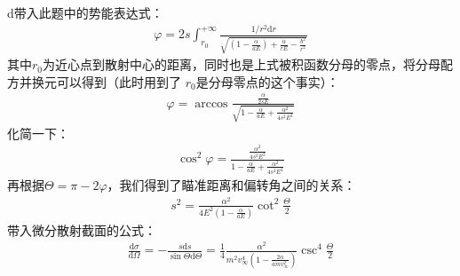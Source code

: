 \documentclass[a4paper]{ctexart}
\def\d{\mathrm{d}}
\begin{document}
    d带入此题中的势能表达式：
    \begin{align}
        \varphi = 2s\int_{r_{0}}^{+\infty}\frac{1/r^{2}\d r}{\sqrt{\left(1 - \frac{\alpha}{aE}\right) + \frac{\alpha}{rE} - \frac{b^{2}}{r^{2}}}}
    \end{align}
    其中$r_{0}$为近心点到散射中心的距离，同时也是上式被积函数分母的零点，将分母配方并换元可以得到（此时用到了
    $r_{0}$是分母零点的这个事实）：
    \begin{align}
        \varphi = \arccos\frac{\frac{\alpha}{2sE}}{\sqrt{1-\frac{\alpha}{aE} + \frac{\alpha^{2}}{4s^{2}E^{2}}}}
    \end{align}
    化简一下：
    \begin{align}
        \cos^{2}\varphi = \frac{\frac{\alpha^{2}}{4s^{2}E^{2}}}{1-\frac{\alpha}{aE} + \frac{\alpha^{2}}{4s^{2}E^{2}}}
    \end{align}
    再根据$\Theta = \pi - 2\varphi$，我们得到了瞄准距离和偏转角之间的关系：
    \begin{align}
        s^{2} = \frac{\alpha^{2}}{4E^{2}\left(1 - \frac{\alpha}{aE}\right)}\cot^{2}\frac{\Theta}{2}
    \end{align}
    带入微分散射截面的公式：
    \begin{align}
        \frac{\d \sigma}{\d\Omega} = -\frac{s\d s}{\sin\Theta \d \Theta} = \frac{1}{4}\frac{\alpha^{2}}{m^{2}v_{\infty}^{4}\left(1 - \frac{2\alpha}{amv_{\infty}^{2}}\right)}\csc^{4}\frac{\Theta}{2}
    \end{align}
\end{document}
